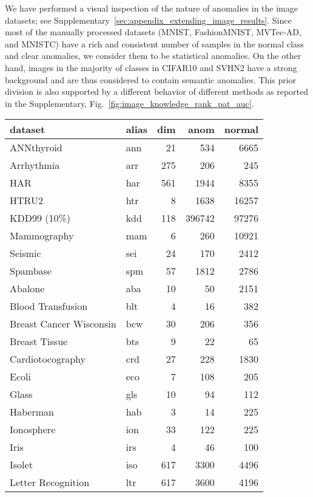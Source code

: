 We have performed a visual inspection of the nature of anomalies in the image datasets; see Supplementary~\ref{sec:appendix_extending_image_results}. Since most of the manually processed datasets (MNIST, FashionMNIST, MVTec-AD, and MNISTC) have a rich and consistent number of samples in the normal class and clear anomalies, we consider them to be statistical anomalies. On the other hand, images in the majority of classes in CIFAR10 and SVHN2 have a strong background and are thus considered to contain semantic anomalies. This prior division is also supported by a different behavior of different methods as reported in the Supplementary, Fig.~\ref{fig:image_knowledge_rank_pat_auc}. 

\begin{table}
\centering
\tabcolsep=0.1cm
\begin{tabular}{llrrr}
\toprule
\textbf{dataset} & \textbf{alias} & \textbf{dim} & \textbf{anom} & \textbf{normal}   \\\midrule
ANNthyroid & ann  & 21 & 534 & 6665 \\
Arrhythmia & arr  & 275 & 206 & 245 \\
HAR & har & 561 & 1944 & 8355  \\
HTRU2 & htr & 8 & 1638 & 16257  \\
KDD99 (10\%) & kdd & 118 & 396742 & 97276  \\
Mammography & mam & 6 & 260 & 10921  \\
Seismic & sei  & 24 & 170 & 2412  \\
Spambase & spm & 57 & 1812 & 2786  \\
\midrule
Abalone & aba & 10 & 50 & 2151  \\
Blood Transfusion & blt & 4 & 16 & 382  \\
Breast Cancer Wisconsin & bcw  & 30 & 206 & 356 \\
Breast Tissue & bts & 9 & 22 & 65 \\
Cardiotocography & crd & 27 & 228 & 1830  \\
Ecoli & eco & 7 & 108 & 205  \\
Glass & gls & 10 & 94 & 112  \\
Haberman & hab & 3 & 14 & 225  \\
Ionosphere & ion & 33 & 122 & 225  \\
Iris & irs & 4 & 46 & 100  \\
Isolet & iso & 617 & 3300 & 4496  \\
Letter Recognition & ltr & 617 & 3600 & 4196  \\

\end{tabular}
\end{table}
